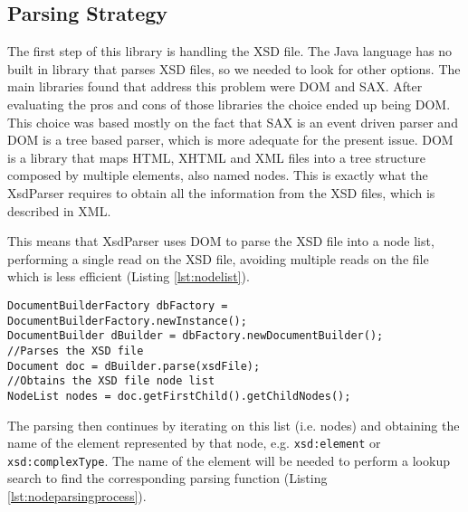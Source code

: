 \subsection{Parsing Strategy}
\label{sec:parsingstrategy}

The first step of this library is handling the \ac{XSD} file. The Java language has no built in library that parses \ac{XSD} files, so we needed to look for other options. The main libraries found that address this problem were \ac{DOM} and \ac{SAX}. After evaluating the pros and cons of those libraries the choice ended up being \ac{DOM}. This choice was based mostly on the fact that \ac{SAX} is an event driven parser and \ac{DOM} is a tree based parser, which is more adequate for the present issue. \ac{DOM} is a library that maps \ac{HTML}, \ac{XHTML} and \ac{XML} files into a tree structure composed by multiple elements, also named nodes. This is exactly what the XsdParser requires to obtain all the information from the \ac{XSD} files, which is described in \ac{XML}. 

\noindent
This means that XsdParser uses \ac{DOM} to parse the \ac{XSD} file into a node list, performing a single read on the \ac{XSD} file, avoiding multiple reads on the file which is less efficient (Listing \ref{lst:nodelist}). 

\bigskip

\begin{minipage}{\linewidth}
\begin{lstlisting}[caption={DOM Document Parsing},captionpos=b,label={lst:nodelist}]
DocumentBuilderFactory dbFactory = DocumentBuilderFactory.newInstance();
DocumentBuilder dBuilder = dbFactory.newDocumentBuilder();
//Parses the XSD file
Document doc = dBuilder.parse(xsdFile);
//Obtains the XSD file node list
NodeList nodes = doc.getFirstChild().getChildNodes();
\end{lstlisting}
\end{minipage}

\newpage

\noindent
The parsing then continues by iterating on this list (i.e. nodes) and obtaining the name of the element represented by that node, e.g. \texttt{xsd:element} or \texttt{xsd:complexType}. The name of the element will be needed to perform a lookup search to find the corresponding parsing function (Listing \ref{lst:nodeparsingprocess}). 

\medskip

